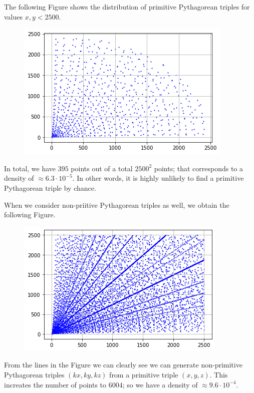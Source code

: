 
The following Figure shows the distribution of primitive Pythagorean triples for values $x, y < 2500$.

\begin{figure}[H]
    \centering
    \includegraphics[scale=0.75]{images/2023-03-28-triples_2.png}
\end{figure}

In total, we have $395$ points out of a total $2500^2$ points; that corresponds to a density of $\approx 6.3 \cdot 10^{-5}$. In other words, it is highly unlikely to find a primitive Pythagorean triple by chance.

When we consider non-priitive Pythagorean triples as well, we obtain the following Figure.

\begin{figure}[H]
    \centering
    \includegraphics[scale=0.75]{images/2023-03-28-triples_3.png}
\end{figure}

From the lines in the Figure we can clearly see we can generate non-primitive Pythagorean triples $(kx, ky, kz)$ from a primitive triple $(x,y,z)$. This increates the number of points to $6004$; so we have a density of $\approx 9.6 \cdot 10^{-4}$.

